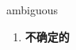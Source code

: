 
\begin{frame}
{\huge ambiguous}
\begin{center}
\begin{enumerate}\Large
  \item \textbf{不确定的}
\end{enumerate}
\end{center}
\end{frame}
